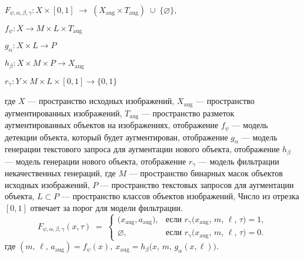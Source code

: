 \begin{center}

$
F_{\psi,\alpha,\beta,\gamma} : X \times [0,1] \;\longrightarrow\; (X_{\text{aug}} \times T_{\text{aug}}) \;\cup\; \{\varnothing\}, 
$

\end{center}
\begin{center}
$ f_{\psi}: X \to M \times L \times T_{\text{aug}}$
\end{center}
\begin{center}
$ g_{\alpha}: X \times L \to P$
\end{center}
\begin{center}
$ h_{\beta}: X \times M \times P \to X_{\text{aug}}$

\end{center}
\begin{center}
$ r_{\gamma}: Y \times M \times L \times [0,1] \to \{0,1\}$

\end{center}


где $X$ — пространство исходных изображений,  
$X_{\text{aug}}$ — пространство аугментированных изображений, $T_{\text{aug}}$ — пространство разметок аугментированных объектов на изображениях, отображение
$f_{\psi}$ — модель детекции объекта, который будет аугментирован, отображение $g_{\alpha}$ — модель генерации текстового запроса для аугментации нового объекта, отображение $h_{\beta}$ — модель генерации нового объекта, отображение $r_{\gamma}$ — модель фильтрации некачественных генераций, где $M$ — пространство бинарных масок объектов исходных изображений,  $P$ — пространство текстовых запросов для аугментации объекта, 
$L \subset P$ — пространство классов объектов изображений,
Число из отрезка $[0,1]$ отвечает за порог для модели фильтрации.
\[
F_{\psi,\alpha,\beta,\gamma}(x, \tau) \;=\;
\begin{cases}
\bigl(x_\mathrm{aug}, a_\mathrm{aug}), 
& \text{если } r_{\gamma}\bigl(x_\mathrm{aug},\,m,\,\ell,\,\tau\bigr) = 1,\\[1em]
\varnothing, 
& \text{если } r_{\gamma}\bigl(x_\mathrm{aug},\,m,\,\ell,\,\tau\bigr) = 0.
\end{cases}
\]
где 
$ 
(m,\,\ell,\, a_\mathrm{aug}) = f_{\psi}(x),  \ x_\mathrm{aug} = h_{\beta}\bigl(x,\,m,\,g_{\alpha}(x, \ell)\bigr)$.


